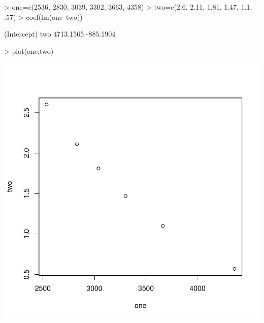 \documentclass{article}
\begin{document}
\begin{Schunk}
\begin{Sinput}
> one=c(2536, 2830, 3039, 3302, 3663, 4358)
> two=c(2.6, 2.11, 1.81, 1.47, 1.1, .57)
> coef(lm(one~two))
\end{Sinput}
\begin{Soutput}
(Intercept)         two 
  4713.1565   -885.1904 
\end{Soutput}
\begin{Sinput}
> plot(one,two)
\end{Sinput}
\end{Schunk}
\includegraphics{Chemistry1-002}
\end{document}
